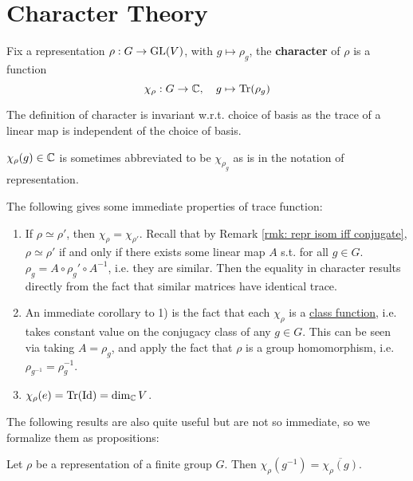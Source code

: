 \section{Character Theory}

\begin{definition}[Character]
    Fix a representation $\rho: G \to \mathrm{GL}(V)$, with $g \mapsto \rho_g$, the \textbf{character} of $\rho$ is a function
    \[
        \chi_{\rho}: G \to \mathbb{C}, \quad g \mapsto \operatorname{Tr}(\rho_g)
    \]
\end{definition}

\begin{remark}
    The definition of character is invariant w.r.t. choice of basis as the trace of a linear map is independent of the choice of basis. 
\end{remark}

\begin{notation}
    $\chi_{\rho}(g) \in \mathbb{C}$ is sometimes abbreviated to be $\chi_{\rho_g}$ as is in the notation of representation.
\end{notation}

\textstart
The following gives some immediate properties of trace function:
\begin{enumerate}[label=\arabic*)]
    \item If $\rho \simeq \rho'$, then $\chi_{\rho} = \chi_{\rho'}$. Recall that by Remark \ref{rmk: repr isom iff conjugate}, $\rho \simeq \rho'$ if and only if there exists some linear map $A$ s.t. for all $g \in G$. $\rho_g = A \circ \rho_g' \circ A^{-1}$, i.e. they are similar. Then the equality in character results directly from the fact that similar matrices have identical trace.
    \item An immediate corollary to 1) is the fact that each $\chi_{\rho}$ is a \underline{class function}, i.e. takes constant value on the conjugacy class of any $g \in G$. This can be seen via taking $A = \rho_g$, and apply the fact that $\rho$ is a group homomorphism, i.e. $\rho_{g^{-1}} = \rho_g^{-1}$.
    \item $\chi_{\rho}(e) = \operatorname{Tr}(\mathrm{Id}) = \dim_{\mathbb{C}} V$.
\end{enumerate}

\textstart
The following results are also quite useful but are not so immediate, so we formalize them as propositions:
\begin{proposition}\label{prop: character of inverse of conjugate of character}
    Let $\rho$ be a representation of a finite group $G$. Then $\chi_{\rho}(g^{-1}) = \overline{\chi_{\rho}(g)}$.
\end{proposition}

